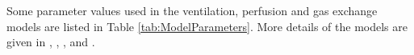 %
%
%
%
%
%
%

Some parameter values used in the ventilation, perfusion and gas exchange models are listed in Table \ref{tab:ModelParameters}. More details of the models are given in \cite{swan2010evidence}, \cite{swan2010multi}, \cite{clark2011interdependent}, and \cite{swan2012computational}.

